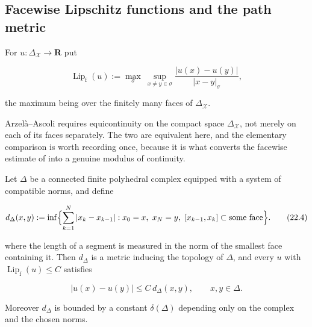 \subsection{Facewise Lipschitz functions and the path metric}

\begin{definition}
\label{def:ch22-facewise-lipschitz}
For $u:\Delta_{\mathcal X}\to\mathbf R$ put

\[
 \operatorname{Lip}_{\mathrm f}(u)
 :=\max_{\sigma}\ \sup_{x\neq y\in\sigma}
       \frac{|u(x)-u(y)|}{|x-y|_\sigma},
\tag{22.3}\label{eq:ch22-facewise-lipschitz}
\]

the maximum being over the finitely many faces of
$\Delta_{\mathcal X}$.
\end{definition}

Arzel\`a--Ascoli requires equicontinuity on the compact space
$\Delta_{\mathcal X}$, not merely on each of its faces separately.  The two
are equivalent here, and the elementary comparison is worth recording once,
because it is what converts the facewise estimate of
 into a genuine modulus of continuity.

\begin{lemma}
\label{lem:ch22-path-metric}
Let $\Delta$ be a connected finite polyhedral complex equipped with a
system of compatible norms, and define

\[
 d_\Delta(x,y):=\inf\Bigl\{\sum_{k=1}^{N}|x_{k}-x_{k-1}|:
     x_0=x,\ x_N=y,\ [x_{k-1},x_k]\subset\text{some face}\Bigr\}.
\tag{22.4}\label{eq:ch22-path-metric}
\]

where the length of a segment is measured in the norm of the smallest face
containing it.  Then $d_\Delta$ is a metric inducing the topology of
$\Delta$, and every $u$ with
$\operatorname{Lip}_{\mathrm f}(u)\leq C$ satisfies

\[
     |u(x)-u(y)|\leq C\,d_\Delta(x,y),
     \qquad x,y\in\Delta .
\tag{22.5}\label{eq:ch22-global-lipschitz}
\]

Moreover $d_\Delta$ is bounded by a constant $\delta(\Delta)$ depending
only on the complex and the chosen norms.
\end{lemma}

